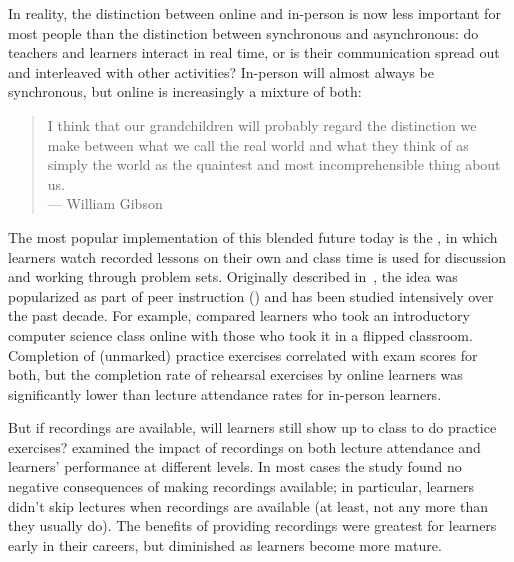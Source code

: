 In reality,
the distinction between online and in-person is now less important for most people
than the distinction between synchronous and asynchronous:
do teachers and learners interact in real time,
or is their communication spread out and interleaved with other activities?
In-person will almost always be synchronous,
but online is increasingly a mixture of both:

\begin{quote}

  I think that our grandchildren will probably regard the distinction we make
  between what we call the real world and what they think of as simply the world
  as the quaintest and most incomprehensible thing about us. \\
  --- William Gibson

\end{quote}

The most popular implementation of this blended future today
is the ,
in which learners watch recorded lessons on their own
and class time is used for discussion and working through problem sets.
Originally described in~\cite{King1993},
the idea was popularized as part of peer instruction ()
and has been studied intensively over the past decade.
For example,
\cite{Camp2016} compared learners who took an introductory computer science class online
with those who took it in a flipped classroom.
Completion of (unmarked) practice exercises correlated with exam scores for both,
but the completion rate of rehearsal exercises by online learners
was significantly lower than lecture attendance rates for in-person learners.

But if recordings are available,
will learners still show up to class to do practice exercises?
\cite{Nord2017} examined the impact of recordings on both lecture attendance
and learners' performance at different levels.
In most cases the study found no negative consequences of making recordings available;
in particular,
learners didn't skip lectures when recordings are available
(at least, not any more than they usually do).
The benefits of providing recordings were greatest for learners early in their careers,
but diminished as learners become more mature.

